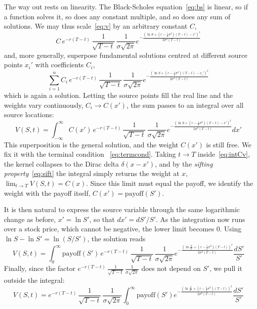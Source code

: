 \documentclass[a4paper,12pt]{article}
\numberwithin{equation}{section}
\begin{document}
The way out rests on linearity. The Black-Scholes equation~\eqref{eq:bs} is
linear, so if a function solves it, so does any constant multiple, and so does
any sum of solutions. We may thus scale~\eqref{eq:v} by an arbitrary constant
$C$,
\begin{equation}\label{eq:Kv}
C\,e^{-r(T-t)}\,\frac{1}{\sqrt{T-t}}\,\frac{1}{\sigma\sqrt{2\pi}}
      e^{-
        \frac{\left(\ln S + \left(r - \frac{1}{2}\sigma^2\right)(T-t) - x'\right)^2}{2\sigma^2(T-t)}
      }
\end{equation}
and, more generally, superpose fundamental solutions centred at different source
points $x_i'$ with coefficients $C_i$,
\begin{equation}\label{eq:sigmaCv}
    \sum_{i=1}^n C_i\,e^{-r(T-t)}\,\frac{1}{\sqrt{T-t}}\,\frac{1}{\sigma\sqrt{2\pi}}
      e^{-
        \frac{\left(\ln S + \left(r - \frac{1}{2}\sigma^2\right)(T-t) - x_i'\right)^2}{2\sigma^2(T-t)}
      }
\end{equation}
which is again a solution. Letting the source points fill the real line and the
weights vary continuously, $C_i \to C(x')$, the sum passes to an integral over
all source locations:
\begin{equation}\label{eq:intCv}
  V(S,t) = \int_{-\infty}^{\infty} C(x')\,e^{-r(T-t)}\,
    \frac{1}{\sqrt{T-t}}\,\frac{1}{\sigma\sqrt{2\pi}}
    e^{-
        \frac{\left(\ln S + \left(r - \frac{1}{2}\sigma^2\right)(T-t) - x'\right)^2}{2\sigma^2(T-t)}
      } dx'
\end{equation}
This superposition is the general solution, and the weight $C(x')$ is still free.
We fix it with the terminal condition ~\eqref{eq:termcond}. Taking $t \to T$ inside~\eqref{eq:intCv},
the kernel collapses to the Dirac delta $\delta(x-x')$, and by the \textit{sifting
property}~\eqref{eq:sift} the integral simply returns the weight at $x$,
$\lim_{t\to T} V(S,t) = C(x)$. Since this limit must equal the payoff, we
identify the weight with the payoff itself, $C(x') = \mathrm{payoff}(S')$.

It is then natural to express the source variable through the same logarithmic
change as before, $x' = \ln S'$, so that $dx' = dS'/S'$. As the integration now
runs over a stock price, which cannot be negative, the lower limit becomes $0$.
Using $\ln S - \ln S' = \ln(S/S')$, the solution reads
\begin{equation}\label{eq:payoffCv}
  V(S,t) = \int_{0}^{\infty} \mathrm{payoff}(S')\,e^{-r(T-t)}\,
    \frac{1}{\sqrt{T-t}}\,\frac{1}{\sigma\sqrt{2\pi}}
    e^{-\frac{\left(\ln\frac{S}{S'} + \left(r - \frac{1}{2}\sigma^2\right)(T-t)\right)^2}{2\sigma^2(T-t)}}
  \frac{dS'}{S'}
\end{equation}
Finally, since the factor
$e^{-r(T-t)}\,\frac{1}{\sqrt{T-t}}\,\frac{1}{\sigma\sqrt{2\pi}}$ does not depend on
$S'$, we pull it outside the integral:
\begin{equation}\label{eq:payoff2Cv}
    V(S,t) = e^{-r(T-t)}\,\frac{1}{\sqrt{T-t}}\,\frac{1}{\sigma\sqrt{2\pi}}
    \int_{0}^{\infty} \mathrm{payoff}(S')
   e^{-\frac{\left(\ln\frac{S}{S'} + \left(r - \frac{1}{2}\sigma^2\right)(T-t)\right)^2}{2\sigma^2(T-t)}}
  \frac{dS'}{S'}
\end{equation}
\end{document}
